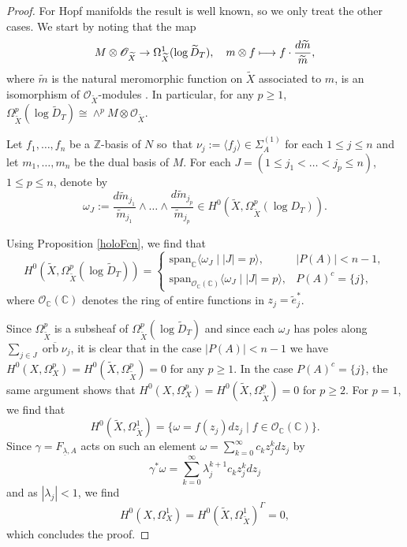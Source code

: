 \documentclass[JEP,XML,SOM,Unicode,NoFloatCountersInSection]{cedram}
\let\mathcal\mathscr
\theoremstyle{definition}
\let\wt\widetilde
\newcommand\mto{\mathchoice{\longmapsto}{\mapsto}{\mapsto}{\mapsto}}
\let\la\lambda
\let\ov\overline
\let\un\underline
\newcommand{\CC}{\mathbb{C}}
\newcommand{\ZZ}{\mathbb{Z}}
\newcommand{\Oo}{\mathcal{O}}
\DeclareMathOperator{\orb}{orb}
\begin{document}
\begin{proof}
For Hopf manifolds the result is well known, so we only treat the other cases. We start by noting that the map
\begin{equation*}
M\otimes\Oo_{\wt{X}}\to\Omega^1_{\wt{X}}(\log\wt{D}_T), \quad m\otimes f\mto f\cdot\frac{d\wt{m}}{\wt{m}},
\end{equation*}
where $\wt{m}$ is the natural meromorphic function on $\wt{X}$ associated to $m$, is an isomorphism of $\Oo_{\wt{X}}$-modules \cite[Prop.\ at p.\,87]{fulton}. In particular, for any $p\geq 1$, $\Omega_{\wt{X}}^p(\log\wt{D}_T)\cong \wedge^p M\otimes\Oo_{\wt{X}}$.

Let $f_1,\ldots, f_n$ be a $\ZZ$-basis of $N$ so~that $\nu_j:=\langle f_j\rangle\in\Sigma_A^{(1)}$ for each $1\leq j \leq n$ and let $m_1,\ldots, m_n$ be the dual basis of $M$. For each $J=(1\leq j_1<\ldots<j_p\leq n)$, $1\leq p\leq n$, denote by
\begin{equation*}
\omega_J:=\frac{d\wt{m}_{j_1}}{\wt{m}_{j_1}}\wedge\ldots\wedge \frac{d\wt{m}_{j_p}}{\wt{m}_{j_p}}\in H^0(\wt{X},\Omega^p_{\wt{X}}(\log D_T)).
\end{equation*}

Using Proposition \ref{holoFcn}, we find that
\begin{equation*}
H^0(\wt{X},\Omega^p_{\wt{X}}(\log \wt{D}_T))=
\begin{cases} \mathrm{span}_{\CC}\langle \omega_J\mid |J|=p\rangle, & |P(A)|<n-1,\\
\mathrm{span}_{\Oo_\CC(\CC)}\langle \omega_J\mid |J|=p\rangle,
&P(A)^c=\{j\},
\end{cases}
\end{equation*}
where $\Oo_\CC(\CC)$ denotes the ring of entire functions in $z_j=\wt{e}_j^*$.

Since $\Omega^p_{\wt{X}}$ is a subsheaf of $\Omega^p_{\wt{X}}(\log\wt{D}_T)$ and since each $\omega_J$ has poles along $\sum_{j\in J}\ov{\orb\nu_j}$, it is clear that in the case $|P(A)|<n-1$ we have $H^0(X,\Omega^p_X)=H^0(\wt{X},\Omega^p_{\wt{X}})=0$ for any $p\geq 1$. In the case $P(A)^c=\{j\}$, the same argument shows that $H^0(X,\Omega^p_X)=H^0(\wt{X},\Omega^p_{\wt{X}})=0$ for $p\geq 2$. For $p=1$, we find that
\begin{equation*}
H^0(\wt{X},\Omega^1_{\wt{X}})=\{ \omega = f(z_j)dz_j\mid f\in\Oo_\CC(\CC)\}.
\end{equation*}
Since $\gamma=F_{\un\la,A}$ acts on such an element $\omega=\sum_{k=0}^\infty c_kz_j^k dz_j$ by
\[
\gamma^*\omega=\sum_{k=0}^\infty\la_j^{k+1}c_kz_j^kdz_j
\]
and as $|\la_j|<1$, we find
\begin{equation*}
H^0(X,\Omega^1_X)=H^0(\wt{X},\Omega^1_{\wt{X}})^\Gamma=0,
\end{equation*}
which concludes the proof.
\end{proof}
\end{document}
